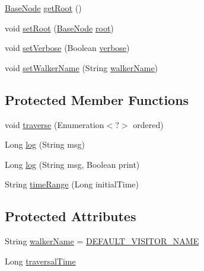 \begin{DoxyCompactItemize}
\item 
\hyperlink{classit_1_1emarolab_1_1cagg_1_1core_1_1BaseNode}{Base\-Node} \hyperlink{classit_1_1emarolab_1_1cagg_1_1core_1_1BaseNode_1_1TreeVisitor_aa21cce32525f0b71548c1aa5a490d884}{get\-Root} ()
\item 
void \hyperlink{classit_1_1emarolab_1_1cagg_1_1core_1_1BaseNode_1_1TreeVisitor_a0a030953b1f47f3b3aedbbe1e9ba20d5}{set\-Root} (\hyperlink{classit_1_1emarolab_1_1cagg_1_1core_1_1BaseNode}{Base\-Node} \hyperlink{classit_1_1emarolab_1_1cagg_1_1core_1_1BaseNode_1_1TreeVisitor_ac31e11edac71abb866fd7d113a2bb017}{root})
\item 
void \hyperlink{classit_1_1emarolab_1_1cagg_1_1core_1_1BaseNode_1_1TreeVisitor_ac1dec1bcba93d90783c735fe2e4d8380}{set\-Verbose} (Boolean \hyperlink{classit_1_1emarolab_1_1cagg_1_1core_1_1BaseNode_1_1TreeVisitor_a08821e56497abdbac48f874f8946b335}{verbose})
\item 
void \hyperlink{classit_1_1emarolab_1_1cagg_1_1core_1_1BaseNode_1_1TreeVisitor_ab6f22891901c8d33e5ae7a9f471d994f}{set\-Walker\-Name} (String \hyperlink{classit_1_1emarolab_1_1cagg_1_1core_1_1BaseNode_1_1TreeVisitor_aa7178eb73b988619412baf1d4f97b703}{walker\-Name})
\end{DoxyCompactItemize}
\subsection*{Protected Member Functions}
\begin{DoxyCompactItemize}
\item 
void \hyperlink{classit_1_1emarolab_1_1cagg_1_1core_1_1BaseNode_1_1TreeVisitor_ab5836cdd44d32b5f50f86245ad1bd13f}{traverse} (Enumeration$<$?$>$ ordered)
\item 
Long \hyperlink{classit_1_1emarolab_1_1cagg_1_1core_1_1BaseNode_1_1TreeVisitor_a07e01c1546faba094db3c49b87973611}{log} (String msg)
\item 
Long \hyperlink{classit_1_1emarolab_1_1cagg_1_1core_1_1BaseNode_1_1TreeVisitor_a9916cb37d906349b6c26efa16e463526}{log} (String msg, Boolean print)
\item 
String \hyperlink{classit_1_1emarolab_1_1cagg_1_1core_1_1BaseNode_1_1TreeVisitor_af0b3d85ed3f7ba96707d2411ae5c16f3}{time\-Range} (Long initial\-Time)
\end{DoxyCompactItemize}
\subsection*{Protected Attributes}
\begin{DoxyCompactItemize}
\item 
String \hyperlink{classit_1_1emarolab_1_1cagg_1_1core_1_1BaseNode_1_1TreeVisitor_aa7178eb73b988619412baf1d4f97b703}{walker\-Name} = \hyperlink{classit_1_1emarolab_1_1cagg_1_1core_1_1BaseNode_ac48c006848405146428a0c553e43429e}{D\-E\-F\-A\-U\-L\-T\-\_\-\-V\-I\-S\-I\-T\-O\-R\-\_\-\-N\-A\-M\-E}
\item 
Long \hyperlink{classit_1_1emarolab_1_1cagg_1_1core_1_1BaseNode_1_1TreeVisitor_a70f41ff815e7ed0a576c4cc35a2f2ade}{traversal\-Time}
\end{DoxyCompactItemize}
